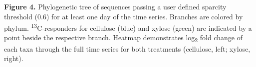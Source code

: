 \textbf{Figure 4.} Phylogenetic tree of sequences passing a user defined sparcity threshold (0.6) for at least one day of the time series. Branches are colored by phylum. \textsuperscript{13}C-responders for cellulose (blue) and xylose (green) are indicated by a point beside the respective branch. Heatmap demonstrates log\textsubscript{2} fold change of each taxa through the full time series for both treatments (cellulose, left; xylose, right).        